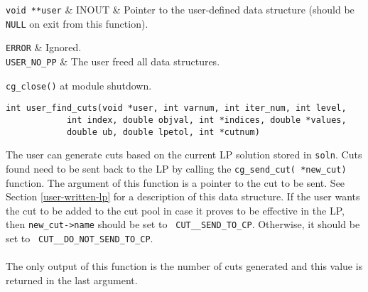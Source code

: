 \args

{\tt void **user} & INOUT & Pointer to the user-defined data structure
(should be {\tt NULL} on exit from this function). \\
\et

\returns

{\tt ERROR} & Ignored. \\
{\tt USER\_NO\_PP} & The user freed all data structures. \\
\et

\item[Invoked from:] {\tt cg\_close()} at module shutdown. 

\ed

\vspace{1ex}


\begin{verbatim}
int user_find_cuts(void *user, int varnum, int iter_num, int level,
		    int index, double objval, int *indices, double *values,
		    double ub, double lpetol, int *cutnum)
\end{verbatim}

\bd

\describe

The user can generate cuts based on the current LP solution stored in
{\tt soln}. Cuts found need to be sent back to the LP by calling the
{\tt cg\_send\_cut( *new\_cut)} function.
The argument of this function is a pointer to the cut to be sent. See
Section
\ref{user-written-lp} for a description of this data structure. If the
user wants the cut to be added to the cut pool in case it proves to be
effective in the LP, then {\tt new\_cut->name} should be set to {\tt
CUT\_\_SEND\_TO\_CP}. Otherwise, it should be set to {\tt
CUT\_\_DO\_NOT\_SEND\_TO\_CP}.\\
\\
The only output of this function is the number of cuts generated and this
value is returned in the last argument.

\args


